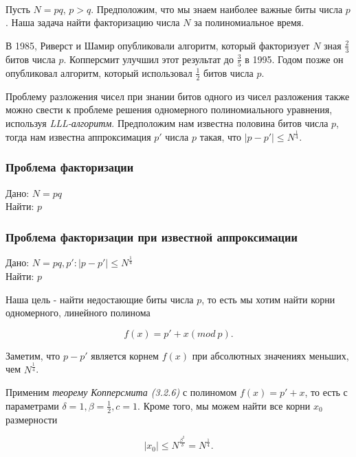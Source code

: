 \paragraph{} Пусть {$N = pq$}, {$p > q$}. Предположим, что мы знаем наиболее важные биты числа {$p$}. Наша задача найти факторизацию числа
  {$N$} за полиномиальное время.
  
  В 1985, Риверст и Шамир опубликовали алгоритм, который факторизует {$N$} зная {$\frac{2}{3}$} битов числа {$p$}. Копперсмит улучшил этот результат
  до {$\frac{3}{5}$} в 1995. Годом позже он опубликовал алгоритм, который использовал {$\frac{1}{2}$} битов числа {$p$}.
  
  Проблему разложения чисел при знании битов одного из чисел разложения также можно свести к проблеме решения одномерного полиномиального
  уравнения, используя \textit{LLL-алгоритм}. Предположим нам известна половина битов числа {$p$}, тогда нам известна аппроксимация {$p'$}
  числа {$p$} такая, что {$|p-p'| \le N^\frac{1}{4}$}.
  
  \subsubsection{Проблема факторизации}
  Дано: {$N = p q$} \\   
  Найти: {$p$}  
  
  \subsubsection{Проблема факторизации при известной аппроксимации}
  Дано: {$ N = p q, p': |p-p'| \le N^\frac{1}{4} $} \\   
  Найти: {$p$}  
  
  Наша цель - найти недостающие биты числа {$p$}, то есть мы хотим найти корни одномерного, линейного полинома
  
    \begin{equation}
      f(x) = p' + x (mod \: p).
    \end{equation}

  Заметим, что {$p-p'$} является корнем {$f(x)$} при абсолютных значениях меньших, чем {$N^\frac{1}{4}$}.
  
  Применим \textit{теорему Копперсмита (3.2.6)} с полиномом {$f(x) = p' + x$}, то есть с параметрами {$\delta = 1, \beta = \frac{1}{2}, c = 1$}.
  Кроме того, мы можем найти все корни {$x_0$} размерности
  
    \begin{equation}
     |x_0| \le N^\frac{\beta^2}{\delta} = N^\frac{1}{4}.
    \end{equation}
    
